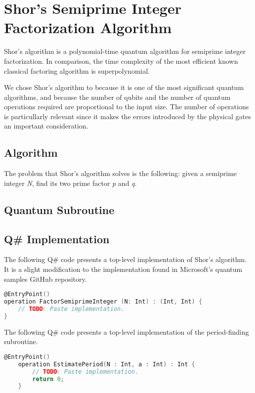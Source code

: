 %
%
\chapter {Shor's Semiprime Integer Factorization Algorithm}

Shor's algorithm is a polynomial-time quantum algorithm for semiprime integer factorization. In comparison, the time complexity of the most efficient known classical factoring algorithm is superpolynomial.

We chose Shor's algorithm to because it is one of the most significant quantum algorithms, and because the number of qubits and the number of quantum operations required are proportional to the input size. The number of operations is particullarly relevant since it makes the errors introduced by the physical gates an important consideration.

\section{Algorithm}

The problem that Shor's algorithm solves is the following: given a semiprime integer \textit{N}, find its two prime factor \textit{p} and \textit{q}.


\section{Quantum Subroutine}


\section{Q\# Implementation}

The following Q\# code presents a top-level implementation of Shor's algorithm. It is a slight modification to the implementation found in Microsoft's quantum samples GitHub repository.




\begin{lstlisting}[language=C]
@EntryPoint()
operation FactorSemiprimeInteger (N: Int) : (Int, Int) {
    // TODO: Paste implementation.
}
\end{lstlisting}

The following Q\# code presents a top-level implementation of the period-finding subroutine.

\begin{lstlisting}[language=C]
    @EntryPoint()
    operation EstimatePeriod(N : Int, a : Int) : Int {
        // TODO: Paste implementation.
        return 0;
    }
\end{lstlisting}
